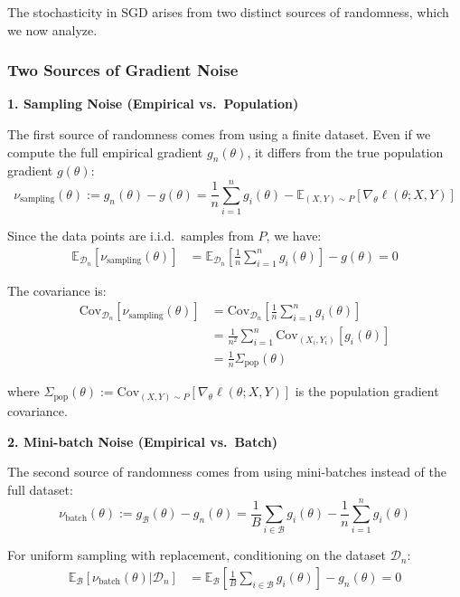 \documentclass[11pt]{article}
\begin{document}
The stochasticity in SGD arises from two distinct sources of randomness, which we now analyze.

\subsubsection{Two Sources of Gradient Noise}

\textbf{1. Sampling Noise (Empirical vs.\ Population)}

The first source of randomness comes from using a finite dataset. Even if we compute the full empirical gradient $g_n(\theta)$, it differs from the true population gradient $g(\theta)$:
$$\nu_{\text{sampling}}(\theta) := g_n(\theta) - g(\theta) = \frac{1}{n} \sum_{i=1}^n g_i(\theta) - \mathbb{E}_{(X,Y) \sim P}[\nabla_\theta \ell(\theta; X, Y)]$$

Since the data points are i.i.d.\ samples from $P$, we have:
\begin{align}
\mathbb{E}_{\mathcal{D}_n}[\nu_{\text{sampling}}(\theta)] &= \mathbb{E}_{\mathcal{D}_n}\left[\frac{1}{n} \sum_{i=1}^n g_i(\theta)\right] - g(\theta) = 0
\end{align}

The covariance is:
\begin{align}
\text{Cov}_{\mathcal{D}_n}[\nu_{\text{sampling}}(\theta)] &= \text{Cov}_{\mathcal{D}_n}\left[\frac{1}{n} \sum_{i=1}^n g_i(\theta)\right] \\
&= \frac{1}{n^2} \sum_{i=1}^n \text{Cov}_{(X_i,Y_i)}[g_i(\theta)] \\
&= \frac{1}{n} \Sigma_{\text{pop}}(\theta)
\end{align}

where $\Sigma_{\text{pop}}(\theta) := \text{Cov}_{(X,Y) \sim P}[\nabla_\theta \ell(\theta; X, Y)]$ is the population gradient covariance.

\textbf{2. Mini-batch Noise (Empirical vs.\ Batch)}

The second source of randomness comes from using mini-batches instead of the full dataset:
$$\nu_{\text{batch}}(\theta) := g_{\mathcal{B}}(\theta) - g_n(\theta) = \frac{1}{B} \sum_{i \in \mathcal{B}} g_i(\theta) - \frac{1}{n} \sum_{i=1}^n g_i(\theta)$$

For uniform sampling with replacement, conditioning on the dataset $\mathcal{D}_n$:
\begin{align}
\mathbb{E}_{\mathcal{B}}[\nu_{\text{batch}}(\theta) | \mathcal{D}_n] &= \mathbb{E}_{\mathcal{B}}\left[\frac{1}{B} \sum_{i \in \mathcal{B}} g_i(\theta)\right] - g_n(\theta) = 0
\end{align}
\end{document}
